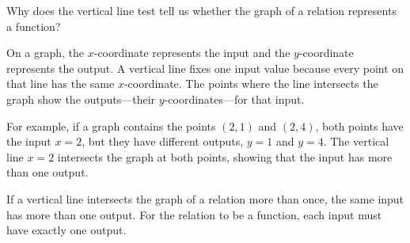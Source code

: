 \documentclass[a4paper,11pt]{article}
\begin{document}
\maketitle

\begin{problem}
Why does the vertical line test tell us whether the graph of a relation represents a function?
\end{problem}

\begin{solution}
On a graph, the \(x\)-coordinate represents the input and the \(y\)-coordinate represents the output. A vertical line fixes one input value because every point on that line has the same \(x\)-coordinate. The points where the line intersects the graph show the outputs---their \(y\)-coordinates---for that input.

For example, if a graph contains the points \((2,1)\) and \((2,4)\), both points have the input \(x=2\), but they have different outputs, \(y=1\) and \(y=4\). The vertical line \(x=2\) intersects the graph at both points, showing that the input has more than one output.
\end{solution}

\begin{answer}
If a vertical line intersects the graph of a relation more than once, the same input has more than one output. For the relation to be a function, each input must have exactly one output.
\end{answer}
\end{document}
